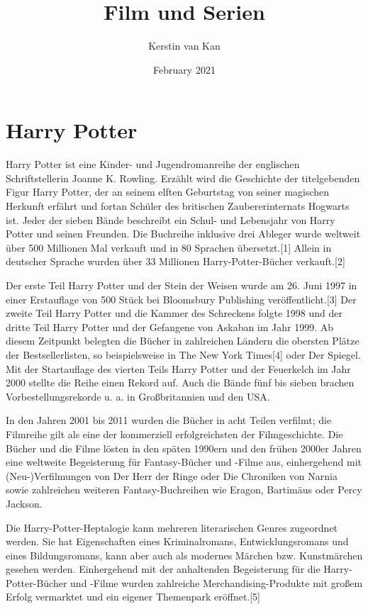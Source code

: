 \documentclass{article}
\title {Film und Serien}
\author {Kerstin van Kan}
\date{February 2021}
\begin{document}
  
  
\maketitle  
\tableofcontents  
  
  
\newpage  
\section {Harry Potter}  
Harry Potter ist eine Kinder- und Jugendromanreihe der englischen Schriftstellerin Joanne K. Rowling. Erzählt wird die Geschichte der titelgebenden Figur Harry Potter, der an seinem elften Geburtstag von seiner magischen Herkunft erfährt und fortan Schüler des britischen Zaubererinternats Hogwarts ist. Jeder der sieben Bände beschreibt ein Schul- und Lebensjahr von Harry Potter und seinen Freunden. Die Buchreihe inklusive drei Ableger wurde weltweit über 500 Millionen Mal verkauft und in 80 Sprachen übersetzt.[1] Allein in deutscher Sprache wurden über 33 Millionen Harry-Potter-Bücher verkauft.[2]  
  
Der erste Teil Harry Potter und der Stein der Weisen wurde am 26. Juni 1997 in einer Erstauflage von 500 Stück bei Bloomsbury Publishing veröffentlicht.[3] Der zweite Teil Harry Potter und die Kammer des Schreckens folgte 1998 und der dritte Teil Harry Potter und der Gefangene von Askaban im Jahr 1999. Ab diesem Zeitpunkt belegten die Bücher in zahlreichen Ländern die obersten Plätze der Bestsellerlisten, so beispielsweise in The New York Times[4] oder Der Spiegel. Mit der Startauflage des vierten Teils Harry Potter und der Feuerkelch im Jahr 2000 stellte die Reihe einen Rekord auf. Auch die Bände fünf bis sieben brachen Vorbestellungsrekorde u. a. in Großbritannien und den USA.  
  
In den Jahren 2001 bis 2011 wurden die Bücher in acht Teilen verfilmt; die Filmreihe gilt als eine der kommerziell erfolgreichsten der Filmgeschichte. Die Bücher und die Filme lösten in den späten 1990ern und den frühen 2000er Jahren eine weltweite Begeisterung für Fantasy-Bücher und -Filme aus, einhergehend mit (Neu-)Verfilmungen von Der Herr der Ringe oder Die Chroniken von Narnia sowie zahlreichen weiteren Fantasy-Buchreihen wie Eragon, Bartimäus oder Percy Jackson.  
  
Die Harry-Potter-Heptalogie kann mehreren literarischen Genres zugeordnet werden. Sie hat Eigenschaften eines Kriminalromans, Entwicklungsromans und eines Bildungsromans, kann aber auch als modernes Märchen bzw. Kunstmärchen gesehen werden. Einhergehend mit der anhaltenden Begeisterung für die Harry-Potter-Bücher und -Filme wurden zahlreiche Merchandising-Produkte mit großem Erfolg vermarktet und ein eigener Themenpark eröffnet.[5]  
  
\end{document}
